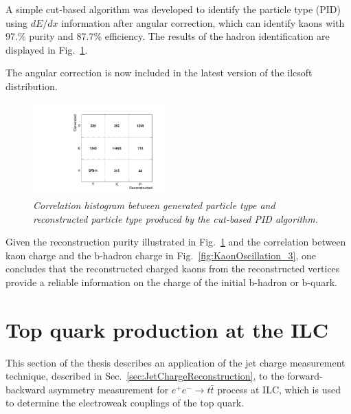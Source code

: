A simple cut-based algorithm was developed to identify the particle type (PID) using $dE/dx$ information after angular correction, which can identify kaons with 97.\% purity and 87.7\% efficiency.
The results of the hadron identification are displayed in Fig.~\ref{fig:dEdxResults_3}.

The angular correction is now included in the latest version of the {\sc ilcsoft} distribution.

\begin{figure}[h]
{\centering
    \includegraphics[width=0.45\textwidth]{ILD/plots/dedx-results.pdf}
    \caption{\sl Correlation histogram between generated particle type and reconstructed particle type produced by the cut-based PID algorithm.
    }
    \label{fig:dEdxResults_3}
  }
 
\end{figure}


Given the reconstruction purity illustrated in Fig.~\ref{fig:dEdxResults_3} and the correlation between kaon charge and the b-hadron charge in Fig.~\ref{fig:KaonOscillation_3}, one concludes that the reconstructed charged kaons from the reconstructed vertices provide a reliable information on the charge of the initial b-hadron or b-quark. 




\section{Top quark production at the ILC}
This section of the thesis describes an application of the jet charge measurement technique, described in Sec.~\ref{sec:JetChargeReconstruction}, to the forward-backward asymmetry measurement for $e^+e^- \to t\bar{t}$ process at ILC, which is used to determine the electroweak couplings of the top quark.


